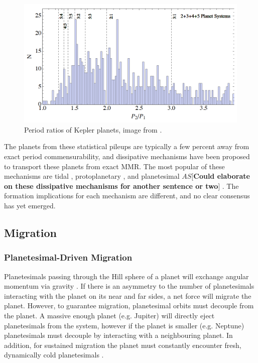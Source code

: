 \documentclass[12pt,letter]{aastex}
\def\memoas#1{\color{red}$AS[${\bf #1}$]$ \color{black}}
\begin{document}
\begin{figure}
\centering
\includegraphics[width=1.00\textwidth]{Figures/KeplerPeriods.png}
\caption{
\footnotesize Period ratios of Kepler planets, image from \citet{Goldreich2014}.}
\label{fig:KepMMR}
\end{figure}

The planets from these statistical pileups are typically a few percent away from exact period commensurability, and dissipative mechanisms have been proposed to transport these planets from exact MMR. 
The most popular of these mechanisms are tidal \citep{LithwickWu2012, Batygin2013, Delisle2014}, protoplanetary \citep{Rein2012b, Baruteau2013, Goldreich2014}, and planetesimal \citep{Moore2013, Chatterjee2015} \memoas{Could elaborate on these dissipative mechanisms for another sentence or two}. 
The formation implications for each mechanism are different, and no clear consensus has yet emerged.


\subsection{Migration}
\subsubsection{Planetesimal-Driven Migration}
Planetesimals passing through the Hill sphere of a planet will exchange angular momentum via gravity \citep{Ida2000, Kirsh2009}.
If there is an asymmetry to the number of planetesimals interacting with the planet on its near and far sides, a net force will migrate the planet. 
However, to guarantee migration, planetesimal orbits must decouple from the planet. 
A massive enough planet (e.g. Jupiter) will directly eject planetesimals from the system, however if the planet is smaller (e.g. Neptune) planetesimals must decouple by interacting with a neighbouring planet. 
In addition, for sustained migration the planet must constantly encounter fresh, dynamically cold planetesimals \citep{Armitage2010}.  
\end{document}

